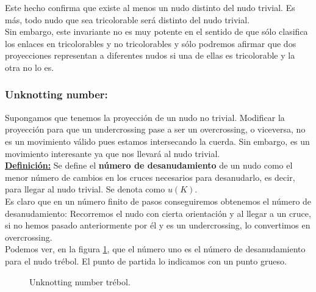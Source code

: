 \documentclass[14pt]{extarticle}
\begin{document}
Este hecho confirma que existe al menos un nudo distinto del nudo trivial. Es más, todo nudo que sea tricolorable será distinto del nudo trivial.\\

Sin embargo, este invariante no es muy potente en el sentido de que sólo clasifica los enlaces en tricolorables y no tricolorables y sólo podremos afirmar que dos proyecciones representan a diferentes nudos si una de ellas es tricolorable y la otra no lo es.   


\bigskip
\begin{center}
	\subsubsection{Unknotting number:}\label{subunk}
\end{center}
Supongamos que tenemos la proyección de un nudo no trivial. Modificar la proyección para que un undercrossing pase a ser un overcrossing, o viceversa, no es un movimiento válido pues estamos intersecando la cuerda. Sin embargo, es un movimiento interesante ya que nos llevará al nudo trivial. \\

\underline{\textbf{Definición:}}
Se define el \textbf{número de desanudamiento} de un nudo como el menor número de cambios en los cruces necesarios para desanudarlo, es decir, para llegar al nudo trivial. Se denota como $u(K)$. \\

Es claro que en un número finito de pasos conseguiremos obtenemos el número de desanudamiento: Recorremos el nudo con cierta orientación y al llegar a un cruce, si no hemos pasado anteriormente por él y es un undercrossing, lo convertimos en overcrossing. \\ 

Podemos ver, en la figura \ref{unk1}, que el número uno es el número de desanudamiento para el nudo trébol. El punto de partida lo indicamos con un punto grueso.
   \begin{figure}[h!]
   	\centering
   	\caption{Unknotting number trébol.}
   	\label{unk1} 
   \end{figure}
\end{document}
